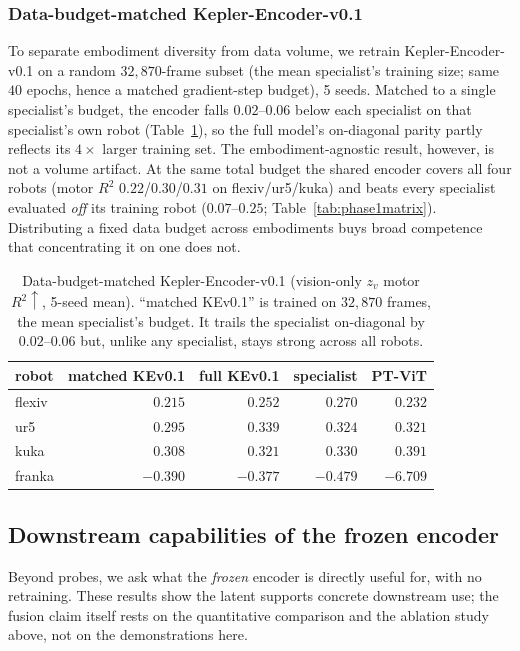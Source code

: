 \documentclass{article}
\begin{document}
\subsubsection{Data-budget-matched Kepler-Encoder-v0.1}
To separate embodiment diversity from data volume, we retrain Kepler-Encoder-v0.1 on a random $32{,}870$-frame subset (the mean specialist's training size; same $40$ epochs, hence a matched gradient-step budget), 5 seeds. Matched to a single specialist's budget, the encoder falls $0.02$--$0.06$ below each specialist on that specialist's own robot (Table~\ref{tab:matched}), so the full model's on-diagonal parity partly reflects its $4\times$ larger training set. The embodiment-agnostic result, however, is not a volume artifact. At the same total budget the shared encoder covers all four robots (motor $R^2$ $0.22$/$0.30$/$0.31$ on flexiv/ur5/kuka) and beats every specialist evaluated \emph{off} its training robot ($0.07$--$0.25$; Table~\ref{tab:phase1matrix}). Distributing a fixed data budget across embodiments buys broad competence that concentrating it on one does not.

\begin{table}[!htbp]
  \centering
  \small
  \caption{Data-budget-matched Kepler-Encoder-v0.1 (vision-only $z_v$ motor $R^2\uparrow$, 5-seed mean). ``matched KEv0.1'' is trained on $32{,}870$ frames, the mean specialist's budget. It trails the specialist on-diagonal by $0.02$--$0.06$ but, unlike any specialist, stays strong across all robots.}
  \label{tab:matched}
  \begin{tabular}{lrrrr}
    \toprule
    robot & matched KEv0.1 & full KEv0.1 & specialist & PT-ViT \\
    \midrule
    flexiv & $0.215$ & $0.252$ & $0.270$ & $0.232$ \\
    ur5    & $0.295$ & $0.339$ & $0.324$ & $0.321$ \\
    kuka   & $0.308$ & $0.321$ & $0.330$ & $0.391$ \\
    franka & $-0.390$ & $-0.377$ & $-0.479$ & $-6.709$ \\
    \bottomrule
  \end{tabular}
\end{table}

\subsection{Downstream capabilities of the frozen encoder}
\label{sec:downstream}
Beyond probes, we ask what the \emph{frozen} encoder is directly useful for, with no retraining. These results show the latent supports concrete downstream use; the fusion claim itself rests on the quantitative comparison and the ablation study above, not on the demonstrations here.
\end{document}
